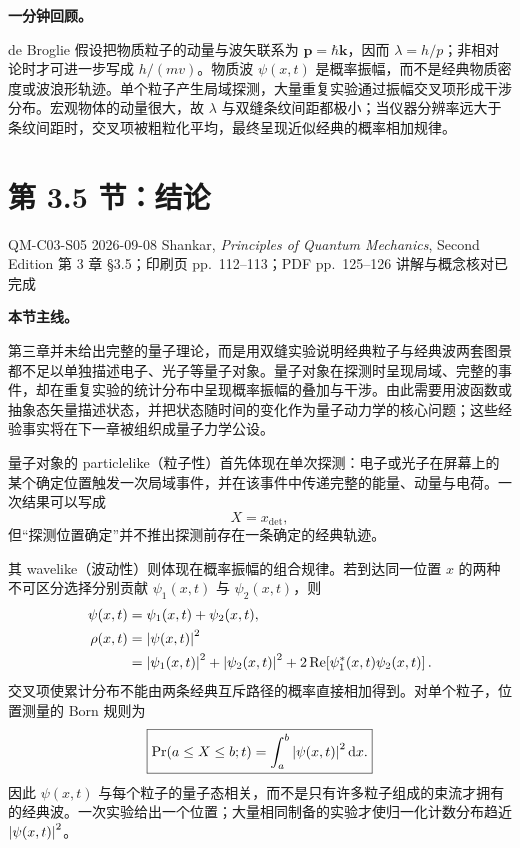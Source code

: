 \textbf{一分钟回顾。}

de Broglie 假设把物质粒子的动量与波矢联系为 $\bm p=\hbar\bm k$，因而 $\lambda=h/p$；非相对论时才可进一步写成 $h/(mv)$。物质波 $\psi(x,t)$ 是概率振幅，而不是经典物质密度或波浪形轨迹。单个粒子产生局域探测，大量重复实验通过振幅交叉项形成干涉分布。宏观物体的动量很大，故 $\lambda$ 与双缝条纹间距都极小；当仪器分辨率远大于条纹间距时，交叉项被粗粒化平均，最终呈现近似经典的概率相加规律。

\section{第 3.5 节：结论}
\label{section:QM-C03-S05}

\studymeta
  {QM-C03-S05}
  {2026-09-08}
  {Shankar, \textit{Principles of Quantum Mechanics}, Second Edition}
  {第 3 章 \S 3.5；印刷页 pp.~112--113；PDF pp.~125--126}
  {讲解与概念核对已完成}

\textbf{本节主线。}

第三章并未给出完整的量子理论，而是用双缝实验说明经典粒子与经典波两套图景都不足以单独描述电子、光子等量子对象。量子对象在探测时呈现局域、完整的事件，却在重复实验的统计分布中呈现概率振幅的叠加与干涉。由此需要用波函数或抽象态矢量描述状态，并把状态随时间的变化作为量子动力学的核心问题；这些经验事实将在下一章被组织成量子力学公设。


量子对象的 particlelike（粒子性）首先体现在单次探测：电子或光子在屏幕上的某个确定位置触发一次局域事件，并在该事件中传递完整的能量、动量与电荷。一次结果可以写成
\begin{equation}
  X=x_{\mathrm{det}},
  \label{eq:QM-C03-S05-local-detection}
\end{equation}
但“探测位置确定”并不推出探测前存在一条确定的经典轨迹。

其 wavelike（波动性）则体现在概率振幅的组合规律。若到达同一位置 $x$ 的两种不可区分选择分别贡献 $\psi_1(x,t)$ 与 $\psi_2(x,t)$，则
\begin{align}
  \psi(x,t)
  &=\psi_1(x,t)+\psi_2(x,t),
  \label{eq:QM-C03-S05-amplitude-sum}\\
  \rho(x,t)
  &=\left|\psi(x,t)\right|^2 \notag\\
  &=\left|\psi_1(x,t)\right|^2+\left|\psi_2(x,t)\right|^2
    +2\operatorname{Re}\!\left[\psi_1^*(x,t)\psi_2(x,t)\right].
  \label{eq:QM-C03-S05-interference-density}
\end{align}
交叉项使累计分布不能由两条经典互斥路径的概率直接相加得到。对单个粒子，位置测量的 Born 规则为
\begin{equation}
  \boxed{
  \Pr(a\leq X\leq b;t)
  =\int_a^b\left|\psi(x,t)\right|^2\mathop{}\!\mathrm{d} x.}
  \label{eq:QM-C03-S05-position-born-rule}
\end{equation}
因此 $\psi(x,t)$ 与每个粒子的量子态相关，而不是只有许多粒子组成的束流才拥有的经典波。一次实验给出一个位置；大量相同制备的实验才使归一化计数分布趋近 $\left|\psi(x,t)\right|^2$。

